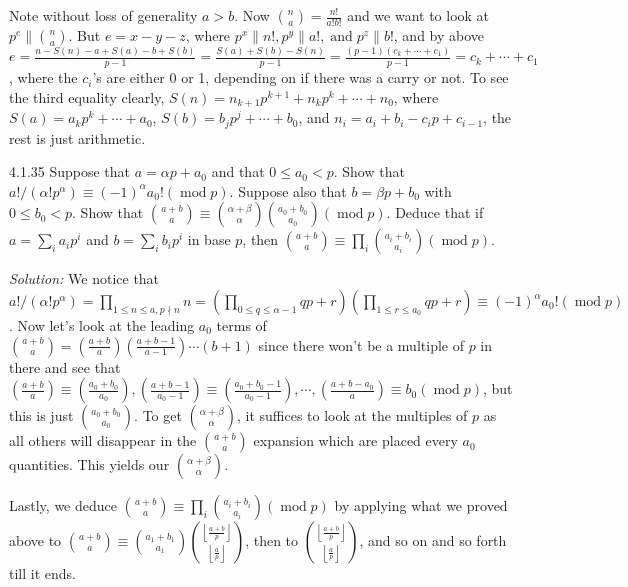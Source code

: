 \documentclass{letter}
\newcommand{\tmem}[1]{{\em #1\/}}
\newcommand{\tmop}[1]{\ensuremath{\operatorname{#1}}}
\begin{document}
Note without loss of generality $a > b$. Now $\binom{n}{a} = \frac{n!}{a!b!}$
and we want to look at $p^e \| \binom{n}{a}$. But $e = x - y - z$, where $p^x
\|n!, p^y \|a!, \tmop{and} p^z \|b!$, and by above $e = \frac{n - S (n) - a +
S (a) - b + S (b)}{p - 1} = \frac{S (a) + S (b) - S (n)}{p - 1} = \frac{(p -
1) (c_k + \cdots + c_1)}{p - 1} = c_k + \cdots + c_1$, where the $c_i$'s are
either 0 or 1, depending on if there was a carry or not. To see the third
equality clearly, $S (n) = n_{k + 1} p^{k + 1} + n_k p^k + \cdots + n_0$,
where $S (a) = a_k p^k + \cdots + a_0$, $S (b) = b_j p^j + \cdots + b_0$, and
$n_i = a_i + b_i - c_i p + c_{i - 1}$, the rest is just arithmetic.

4.1.35 Suppose that $a = \alpha p + a_0$ and that $0 \leq a_0 < p$. Show that
$a! / (\alpha !p^{\alpha}) \equiv (- 1)^{\alpha} a_0 ! (\tmop{mod} p)$.
Suppose also that $b = \beta p + b_0$ with $0 \leq b_0 < p$. Show that
$\binom{a + b}{a} \equiv \binom{\alpha + \beta}{\alpha} \binom{a_0 + b_0}{a_0}
(\tmop{mod} p)$. Deduce that if $a = \sum_i a_i p^i$ and $b = \sum_i b_i p^i$
in base $p$, then $\binom{a + b}{a} \equiv \prod_i \binom{a_i + b_i}{a_i}
(\tmop{mod} p)$.

{\tmem{Solution:}} We notice that $a! / (\alpha !p^{\alpha}) = \prod_{1 \leq n
\leq a, p \nmid n} n = ( \prod_{0 \leq q \leq \alpha - 1} q p + r) ( \prod_{1
\leq r \leq a_0} q p + r) \equiv (- 1)^{\alpha} a_0 ! (\tmop{mod} p)$.
Now let's look at the leading $a_0$ terms of $\binom{a + b}{a} = ( \frac{a +
b}{a}) ( \frac{a + b - 1}{a - 1}) \cdots (b + 1)$ since there won't be a
multiple of $p$ in there and see that $( \frac{a + b}{a}) \equiv ( \frac{a_0 +
b_0}{a_0}), ( \frac{a + b - 1}{a_0 - 1}) \equiv ( \frac{a_0 + b_0 - 1}{a_0 -
1}), \cdots, ( \frac{a + b - a_0}{a}) \equiv b_0 (\tmop{mod} p)$, but this is
just $\binom{a_0 + b_0}{a_0}$. To get $\binom{\alpha + \beta}{\alpha}$, it
suffices to look at the multiples of $p$ as all others will disappear in the
$\binom{a + b}{a}$ expansion which are placed every $a_0$ quantities. This
yields our $\binom{\alpha + \beta}{\alpha}$.

Lastly, we deduce $\binom{a + b}{a} \equiv \prod_i \binom{a_i + b_i}{a_i}
(\tmop{mod} p)$ by applying what we proved above to $\binom{a + b}{a} \equiv
\binom{a_1 + b_1}{a_1} \binom{\left\lfloor \frac{a + b}{p}
\right\rfloor}{\left\lfloor \frac{a}{p} \right\rfloor}$, then to
$\binom{\left\lfloor \frac{a + b}{p} \right\rfloor}{\left\lfloor \frac{a}{p}
\right\rfloor}$, and so on and so forth till it ends.
\end{document}
